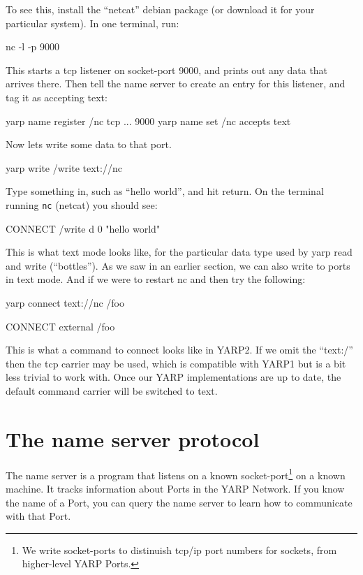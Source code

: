 \documentclass[a4]{article}
\begin{document}
To see this, install the ``netcat'' debian package (or download it
for your particular system).  In one terminal, run:
%
\begin{code}
nc -l -p 9000
\end{code}
%
This starts a tcp listener on socket-port 9000, and prints out
any data that arrives there.  Then tell the name server to
create an entry for this listener, and tag it as accepting text:
%
\begin{code}
yarp name register /nc tcp ... 9000
yarp name set /nc accepts text
\end{code}
%
Now lets write some data to that port.
%
\begin{code}
yarp write /write text://nc
\end{code}
%
Type something in, such as ``hello world'', and hit return.
On the terminal running {\tt nc} (netcat) you should see:
%
\begin{code}
CONNECT /write
d
0 "hello world"
\end{code}
%
This is what text mode looks like, for the particular
data type used by yarp read and write (``bottles'').  
As we saw in an earlier section, we can also write to ports in text mode.
And if we were to restart nc and then try the following:
%
\begin{code}
yarp connect text://nc /foo
\end{code}
%
\begin{code}
CONNECT external
/foo
\end{code}
%
This is what a command to connect looks like in YARP2.  If we omit the
``text:/'' then the tcp carrier may be used, which is compatible with YARP1
but is a bit less trivial to work with.  Once our YARP implementations
are up to date, the default command carrier will be switched to text.



\section{The name server protocol}

\label{sect:name-protocol}

The name server is a program that listens on a known socket-port\footnote{We
write socket-ports to distinuish tcp/ip port numbers for sockets, 
from higher-level YARP Ports.}
on a known machine.
%
It tracks information about Ports in the YARP Network.
%
%
If you know the name
of a Port, you can query the name server to learn how to communicate
with that Port.
\end{document}
